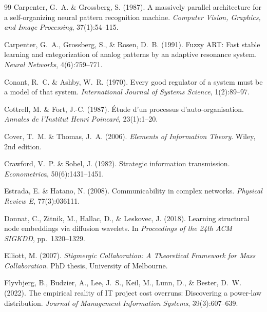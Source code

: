 \documentclass[11pt,a4paper]{article}
\begin{document}
\begin{thebibliography}{99}
Carpenter, G.~A. \& Grossberg, S. (1987).
\newblock A massively parallel architecture for a self-organizing neural pattern recognition machine.
\newblock \emph{Computer Vision, Graphics, and Image Processing}, 37(1):54--115.

Carpenter, G.~A., Grossberg, S., \& Rosen, D.~B. (1991).
\newblock Fuzzy {ART}: Fast stable learning and categorization of analog patterns by an adaptive resonance system.
\newblock \emph{Neural Networks}, 4(6):759--771.

Conant, R.~C. \& Ashby, W.~R. (1970).
\newblock Every good regulator of a system must be a model of that system.
\newblock \emph{International Journal of Systems Science}, 1(2):89--97.

Cottrell, M. \& Fort, J.-C. (1987).
\newblock \'{E}tude d'un processus d'auto-organisation.
\newblock \emph{Annales de l'Institut Henri Poincar\'{e}}, 23(1):1--20.

Cover, T.~M. \& Thomas, J.~A. (2006).
\newblock \emph{Elements of Information Theory}.
\newblock Wiley, 2nd edition.

Crawford, V.~P. \& Sobel, J. (1982).
\newblock Strategic information transmission.
\newblock \emph{Econometrica}, 50(6):1431--1451.

Estrada, E. \& Hatano, N. (2008).
\newblock Communicability in complex networks.
\newblock \emph{Physical Review E}, 77(3):036111.

Donnat, C., Zitnik, M., Hallac, D., \& Leskovec, J. (2018).
\newblock Learning structural node embeddings via diffusion wavelets.
\newblock In \emph{Proceedings of the 24th ACM SIGKDD}, pp.~1320--1329.

Elliott, M. (2007).
\newblock \emph{Stigmergic Collaboration: A Theoretical Framework for Mass Collaboration}.
\newblock PhD thesis, University of Melbourne.

Flyvbjerg, B., Budzier, A., Lee, J.~S., Keil, M., Lunn, D., \& Bester, D.~W. (2022).
\newblock The empirical reality of {IT} project cost overruns: Discovering a power-law distribution.
\newblock \emph{Journal of Management Information Systems}, 39(3):607--639.


\end{thebibliography}
\end{document}
